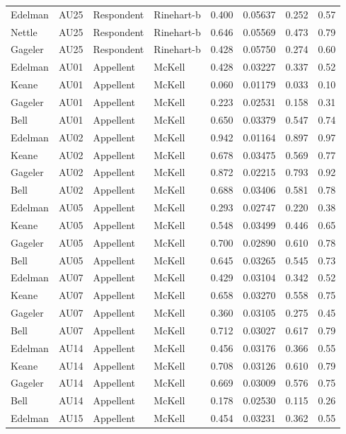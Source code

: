 \documentclass{monashthesis}
\begin{document}
\begin{center}
\begin{longtable}{llllllll}
Edelman & AU25 & Respondent & Rinehart-b & 0.400 & 0.05637 & 0.252 & 0.57 \\
Nettle & AU25 & Respondent & Rinehart-b & 0.646 & 0.05569 & 0.473 & 0.79 \\
Gageler & AU25 & Respondent & Rinehart-b & 0.428 & 0.05750 & 0.274 & 0.60 \\
Edelman & AU01 & Appellent & McKell & 0.428 & 0.03227 & 0.337 & 0.52 \\
Keane & AU01 & Appellent & McKell & 0.060 & 0.01179 & 0.033 & 0.10 \\
Gageler & AU01 & Appellent & McKell & 0.223 & 0.02531 & 0.158 & 0.31 \\
Bell & AU01 & Appellent & McKell & 0.650 & 0.03379 & 0.547 & 0.74 \\
Edelman & AU02 & Appellent & McKell & 0.942 & 0.01164 & 0.897 & 0.97 \\
Keane & AU02 & Appellent & McKell & 0.678 & 0.03475 & 0.569 & 0.77 \\
Gageler & AU02 & Appellent & McKell & 0.872 & 0.02215 & 0.793 & 0.92 \\
Bell & AU02 & Appellent & McKell & 0.688 & 0.03406 & 0.581 & 0.78 \\
Edelman & AU05 & Appellent & McKell & 0.293 & 0.02747 & 0.220 & 0.38 \\
Keane & AU05 & Appellent & McKell & 0.548 & 0.03499 & 0.446 & 0.65 \\
Gageler & AU05 & Appellent & McKell & 0.700 & 0.02890 & 0.610 & 0.78 \\
Bell & AU05 & Appellent & McKell & 0.645 & 0.03265 & 0.545 & 0.73 \\
Edelman & AU07 & Appellent & McKell & 0.429 & 0.03104 & 0.342 & 0.52 \\
Keane & AU07 & Appellent & McKell & 0.658 & 0.03270 & 0.558 & 0.75 \\
Gageler & AU07 & Appellent & McKell & 0.360 & 0.03105 & 0.275 & 0.45 \\
Bell & AU07 & Appellent & McKell & 0.712 & 0.03027 & 0.617 & 0.79 \\
Edelman & AU14 & Appellent & McKell & 0.456 & 0.03176 & 0.366 & 0.55 \\
Keane & AU14 & Appellent & McKell & 0.708 & 0.03126 & 0.610 & 0.79 \\
Gageler & AU14 & Appellent & McKell & 0.669 & 0.03009 & 0.576 & 0.75 \\
Bell & AU14 & Appellent & McKell & 0.178 & 0.02530 & 0.115 & 0.26 \\
Edelman & AU15 & Appellent & McKell & 0.454 & 0.03231 & 0.362 & 0.55 \\

\end{longtable}
\end{center}
\end{document}

